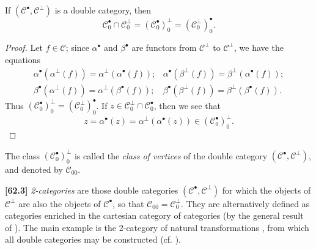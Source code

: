 \documentclass[a4paper,fleqn]{article}
\theoremstyle{plain}
\newenvironment{proposition}[1]
  {\renewcommand\theinnerproposition{#1}\innerproposition}
  {\endinnerproposition}
\theoremstyle{definition}
\newenvironment{definition}[1]
  {\renewcommand\theinnerdefinition{#1}\innerdefinition}
  {\endinnerdefinition}
\newenvironment{longcomm}[1]
  {\noindent\textbf{[#1]}\rmfamily}
  {}
\newcommand{\oldpage}[1]{{\marginpar{\footnotesize$\bigg\vert$\,\,\,\,\textit{p.~#1}}}}
\newcommand{\CC}{\mathcal{C}}
\newcommand{\smallbullet}{\bullet}
\begin{document}
\begin{proposition}{10}
\label{proposition:ii-10}
  If $(\CC^\smallbullet,\CC^\perp)$ is a double category, then
  \[
    \CC_0^\smallbullet\cap\CC_0^\perp
    = (\CC_0^\smallbullet)_0^\perp
    = (\CC_0^\perp)_0^\smallbullet.
  \]
\end{proposition}

\begin{proof}
  Let $f\in\CC$;
  since $\alpha^\smallbullet$ and $\beta^\smallbullet$ are functors from $\CC^\perp$ to $\CC^\perp$, we have the equations
  \[
    \begin{array}{cc}
      \alpha^\smallbullet(\alpha^\perp(f))
      = \alpha^\perp(\alpha^\smallbullet(f));
      & \alpha^\smallbullet(\beta^\perp(f))
      = \beta^\perp(\alpha^\smallbullet(f));
    \\\beta^\smallbullet(\alpha^\perp(f))
      = \alpha^\perp(\beta^\smallbullet(f));
      & \beta^\smallbullet(\beta^\perp(f))
      = \beta^\perp(\beta^\smallbullet(f)).
    \end{array}
  \]
  Thus $(\CC_0^\smallbullet)_0^\perp=(\CC_0^\perp)_0^\smallbullet$.
  If $z\in\CC_0^\perp\cap\CC_0^\smallbullet$, then we see that
  \[
    z
    = \alpha^\smallbullet(z)
    = \alpha^\perp(\alpha^\smallbullet(z))
    \in (\CC_0^\smallbullet)_0^\perp.
  \]
\end{proof}

\begin{definition}{11}
\label{definition:ii-11}
  The class $(\CC_0^\smallbullet)_0^\perp$ is called the \emph{class of vertices} of the double category $(\CC^\smallbullet,\CC^\perp)$, and denoted by $\CC_{00}$.
\end{definition}

\begin{longcomm}{62.3}
  \emph{2-categories} are those double categories $(\CC^\smallbullet,\CC^\perp)$ for which the objects of $\CC^\perp$ are also the objects of $\CC^\smallbullet$, so that $\CC_{00}=\CC_0^\perp$.
  They are alternatively defined as categories enriched in the cartesian category of categories (by the general result of \cite[Appendix]{coll120}).
  The main example is the 2-category of natural transformations \cite{coll52}, from which all double categories may be constructed (cf. \cite[Comment~105.1]{coll64}).
\end{longcomm}

\oldpage{391}
\end{document}
